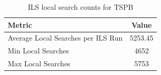 \begin{table}[h!]
\centering
\begin{tabular}{lc}
\hline
Metric & Value \\
\hline
Average Local Searches per ILS Run & 5253.45 \\
Min Local Searches & 4652 \\
Max Local Searches & 5753 \\
\hline
\end{tabular}
\caption{ILS local search counts for TSPB}
\label{tab:TSPB_ils_counts}
\end{table}
